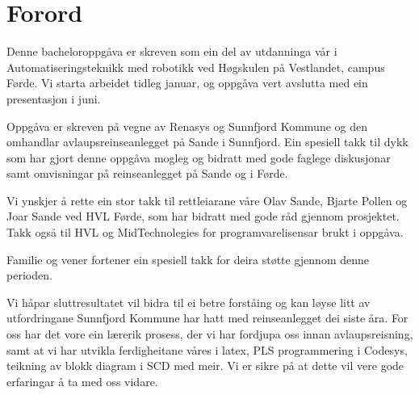 \chapter{Forord}
\thispagestyle{romanpages}

Denne bacheloroppgåva er skreven som ein del av utdanninga vår i Automatiseringsteknikk med robotikk ved Høgskulen på Vestlandet, campus Førde.
Vi starta arbeidet tidleg januar, og oppgåva vert avslutta med ein presentasjon i juni.

Oppgåva er skreven på vegne av \gls{Renasys}\citep{Renasys} og \gls{Sunnfjord Kommune}\citep{SunnfjordKommune} og den omhandlar 
avlaupsreinseanlegget på Sande i Sunnfjord. 
Ein spesiell takk til dykk som har gjort denne oppgåva mogleg og
bidratt med gode faglege diskusjonar samt omvisningar på reinseanlegget på Sande og i Førde.

Vi ynskjer å rette ein stor takk til rettleiarane våre Olav Sande, Bjarte Pollen og Joar Sande ved \gls{HVL} Førde, som har bidratt med gode råd gjennom prosjektet.
Takk også til \gls{HVL} og MidTechnolegies\citep{MIDT} for programvarelisensar brukt i oppgåva.

Familie og vener fortener ein spesiell takk for deira støtte gjennom denne perioden.

Vi håpar sluttresultatet vil bidra til ei betre forståing og kan løyse litt av utfordringane Sunnfjord Kommune har hatt med reinseanlegget dei siste åra.
For oss har det vore ein lærerik prosess, der vi har fordjupa oss innan avlaupsreisning, samt at vi har utvikla ferdigheitane våres i \gls{latex}, 
\gls{PLS} programmering i \gls{Codesys}, teikning av blokk diagram i \gls{SCD} med meir. Vi er sikre på at dette vil vere gode erfaringar å ta med oss vidare.
